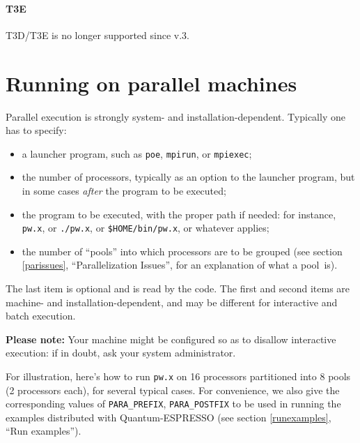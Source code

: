 \documentclass[12pt,a4paper]{article}
\begin{document}
\paragraph{T3E}

T3D/T3E is no longer supported since v.3.

\clearpage

\section{Running on parallel machines}
  \label{runparallel}

Parallel execution is strongly system- and installation-dependent.
Typically one has to specify:

\begin{itemize}
  \item a launcher program, such as \texttt{poe}, \texttt{mpirun}, or
        \texttt{mpiexec};
  \item the number of processors, typically as an option to the
        launcher program, but in some cases \emph{after} the program
        to be executed;
  \item the program to be executed, with the proper path if needed:
        for instance, \texttt{pw.x}, or \texttt{./pw.x}, or
        \texttt{\$HOME/bin/pw.x}, or whatever applies;
  \item the number of ``pools'' into which processors are to be
        grouped (see section \ref{parissues}, ``Parallelization
        Issues'', for an explanation of what a pool~is).
\end{itemize}

The last item is optional and is read by the code.
The first and second items are machine- and installation-dependent,
and may be different for interactive and batch execution.

\textbf{Please note:}
Your machine might be configured so as to disallow interactive
execution: if in doubt, ask your system administrator.
\bigskip

For illustration, here's how to run \texttt{pw.x} on 16 processors
partitioned into 8 pools (2 processors each), for several typical
cases.
For convenience, we also give the corresponding values of
\texttt{PARA\_PREFIX}, \texttt{PARA\_POSTFIX} to be used in running
the examples distributed with Quantum-ESPRESSO (see section \ref{runexamples},
``Run examples'').
\end{document}
